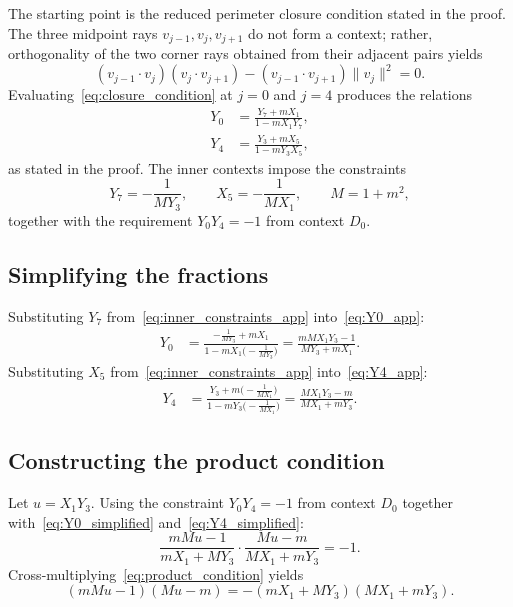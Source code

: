 \documentclass[
  twocolumn,
  aps,
  pra,
  floatfix,
  amsmath,amssymb,
  longbibliography
]{revtex4-2}
\theoremstyle{definition}
\theoremstyle{remark}
\begin{document}
The starting point is the reduced perimeter closure condition stated in
the proof.  The three midpoint rays $v_{j-1},v_j,v_{j+1}$ do not form a
context; rather, orthogonality of the two corner rays obtained from their
adjacent pairs yields
\begin{equation}
(v_{j-1}\cdot v_j)(v_j\cdot v_{j+1})-(v_{j-1}\cdot v_{j+1})\|v_j\|^2=0.
\label{eq:closure_condition}
\end{equation}
Evaluating~\eqref{eq:closure_condition} at $j=0$ and $j=4$ produces
the relations
\begin{align}
Y_0 &= \frac{Y_7+mX_1}{1-mX_1Y_7}, \label{eq:Y0_app} \\
Y_4 &= \frac{Y_3+mX_5}{1-mY_3X_5}, \label{eq:Y4_app}
\end{align}
as stated in the proof. The inner contexts impose the constraints
\begin{equation}
Y_7 = -\frac{1}{MY_3},\qquad
X_5 = -\frac{1}{MX_1},\qquad
M = 1+m^2,
\label{eq:inner_constraints_app}
\end{equation}
together with the requirement $Y_0Y_4 = -1$ from context $D_0$.

\subsection*{Simplifying the fractions}

Substituting $Y_7$ from~\eqref{eq:inner_constraints_app} into~\eqref{eq:Y0_app}:
\begin{align}
Y_0 &= \frac{-\frac{1}{MY_3}+mX_1}{1-mX_1\bigl(-\frac{1}{MY_3}\bigr)}
     = \frac{mMX_1Y_3-1}{MY_3+mX_1}. \label{eq:Y0_simplified}
\end{align}
Substituting $X_5$ from~\eqref{eq:inner_constraints_app} into~\eqref{eq:Y4_app}:
\begin{align}
Y_4 &= \frac{Y_3+m\bigl(-\frac{1}{MX_1}\bigr)}{1-mY_3\bigl(-\frac{1}{MX_1}\bigr)}
     = \frac{MX_1Y_3-m}{MX_1+mY_3}. \label{eq:Y4_simplified}
\end{align}

\subsection*{Constructing the product condition}

Let $u = X_1Y_3$. Using the constraint $Y_0Y_4 = -1$ from context
$D_0$ together with~\eqref{eq:Y0_simplified} and~\eqref{eq:Y4_simplified}:
\begin{equation}
\frac{mMu-1}{mX_1+MY_3}\cdot\frac{Mu-m}{MX_1+mY_3} = -1.
\label{eq:product_condition}
\end{equation}
Cross-multiplying~\eqref{eq:product_condition} yields
\begin{equation}
(mMu-1)(Mu-m) = -(mX_1+MY_3)(MX_1+mY_3).
\label{eq:cross_multiplied}
\end{equation}
\end{document}
